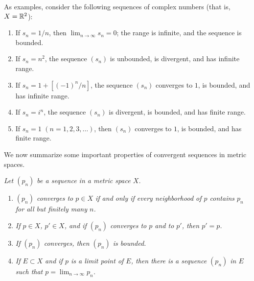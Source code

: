 As examples, consider the following sequences of complex numbers (that is,
$X = \mathbb{R}^2$):
\begin{enumerate}[label=(\alph*), leftmargin=2.2em, itemsep=2pt, topsep=4pt]
  \item If $s_n = 1/n$, then $\lim_{n\to\infty} s_n = 0$; the range is
        infinite, and the sequence is bounded.
  \item If $s_n = n^2$, the sequence $(s_n)$ is unbounded, is divergent, and
        has infinite range.
  \item If $s_n = 1 + [(-1)^n/n]$, the sequence $(s_n)$ converges to $1$, is
        bounded, and has infinite range.
  \item If $s_n = i^n$, the sequence $(s_n)$ is divergent, is bounded, and has
        finite range.
  \item If $s_n = 1$ $(n = 1,2,3,\dots)$, then $(s_n)$ converges to $1$, is
        bounded, and has finite range.
\end{enumerate}

We now summarize some important properties of convergent sequences in metric
spaces.

\emph{Let $(p_n)$ be a sequence in a metric space $X$.}
\begin{enumerate}[label=(\alph*), leftmargin=2.2em, itemsep=1pt, topsep=3pt]
  \item \emph{$(p_n)$ converges to $p \in X$ if and only if every neighborhood
        of $p$ contains $p_n$ for all but finitely many $n$.}
  \item \emph{If $p \in X$, $p' \in X$, and if $(p_n)$ converges to $p$ and to
        $p'$, then $p' = p$.}
  \item \emph{If $(p_n)$ converges, then $(p_n)$ is bounded.}
  \item \emph{If $E \subset X$ and if $p$ is a limit point of $E$, then there
        is a sequence $(p_n)$ in $E$ such that $p = \lim_{n\to\infty} p_n$.}
\end{enumerate}

